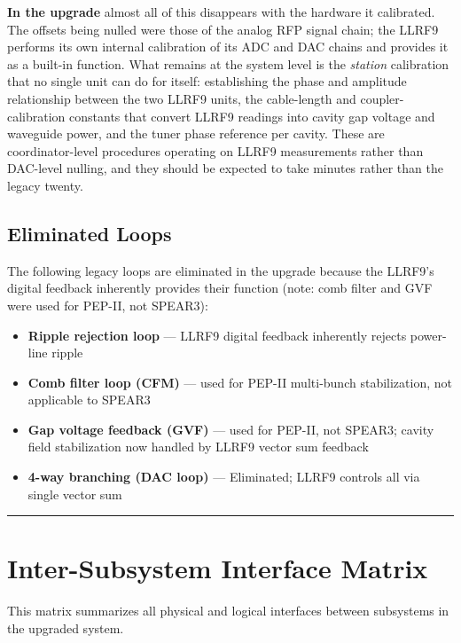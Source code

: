 \textbf{In the upgrade} almost all of this disappears with the hardware it calibrated. The offsets being nulled were those of the analog RFP signal chain; the LLRF9 performs its own internal calibration of its ADC and DAC chains and provides it as a built-in function. What remains at the system level is the \emph{station} calibration that no single unit can do for itself: establishing the phase and amplitude relationship between the two LLRF9 units, the cable-length and coupler-calibration constants that convert LLRF9 readings into cavity gap voltage and waveguide power, and the tuner phase reference per cavity. These are coordinator-level procedures operating on LLRF9 measurements rather than DAC-level nulling, and they should be expected to take minutes rather than the legacy twenty.

\subsection{Eliminated Loops}\label{eliminated-loops}

The following legacy loops are eliminated in the upgrade because the LLRF9's digital feedback inherently provides their function (note: comb filter and GVF were used for PEP-II, not SPEAR3):

\begin{itemize}
\tightlist
\item
  \textbf{Ripple rejection loop} --- LLRF9 digital feedback inherently rejects power-line ripple
\item
  \textbf{Comb filter loop (CFM)} --- used for PEP-II multi-bunch stabilization, not applicable to SPEAR3
\item
  \textbf{Gap voltage feedback (GVF)} --- used for PEP-II, not SPEAR3; cavity field stabilization now handled by LLRF9 vector sum feedback
\item
  \textbf{4-way branching (DAC loop)} --- Eliminated; LLRF9 controls all via single vector sum
\end{itemize}

\begin{center}\rule{0.5\linewidth}{0.5pt}\end{center}

\section{Inter-Subsystem Interface Matrix}\label{inter-subsystem-interface-matrix}

This matrix summarizes all physical and logical interfaces between subsystems in the upgraded system.

